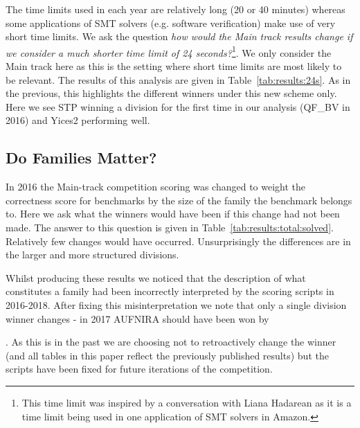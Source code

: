 \documentclass[dvipsnames,table,twoside,11pt]{article}
\begin{document}
The time limits used in each year are relatively long (20 or 40 minutes) whereas some applications of SMT solvers (e.g. software verification) make use of very short time limits. We ask the question \emph{how would the Main track results change if we consider a much shorter time limit of 24 seconds?}\footnote{This time limit was inspired by a conversation with Liana Hadarean as it is a time limit being used in one application of SMT solvers in Amazon.}. We only consider the Main track here as this is the setting where short time limits are most likely to be relevant. The results of this analysis are given in Table~\ref{tab:results:24s}. As in the previous, this highlights the different winners under this new scheme only. Here we see STP winning a division for the first time in our analysis (QF\_BV in 2016) and Yices2 performing well.



\subsection{Do Families Matter?}

In 2016 the Main-track competition scoring was changed to weight the correctness score for benchmarks by the size of the family the benchmark belongs to. Here we ask what the winners would have been if this change had not been made. The answer to this question is given in Table~\ref{tab:results:total:solved}. Relatively few changes would have occurred. Unsurprisingly the differences are in the larger and more structured divisions.

Whilst producing these results we noticed that the description of what constitutes a family had been incorrectly interpreted by the scoring scripts in 2016-2018. After fixing this misinterpretation we note that only a single division winner changes - in 2017 AUFNIRA should have been won by 

. As this is in the past we are choosing not to retroactively change the winner (and all tables in this paper reflect the previously published results) but the scripts have been fixed for future iterations of the competition.
\end{document}
